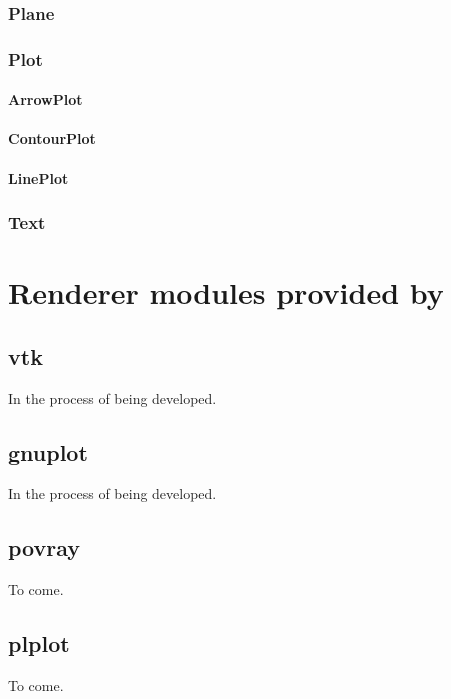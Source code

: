 \subsection{Plane}

\subsection{Plot}

\subsubsection{ArrowPlot}

\subsubsection{ContourPlot}

\subsubsection{LinePlot}

\subsection{Text}


\chapter{Renderer modules provided by \pyvisi}

\section{vtk}

In the process of being developed.

\section{gnuplot}

In the process of being developed.

\section{povray}

To come.

\section{plplot}

To come.

